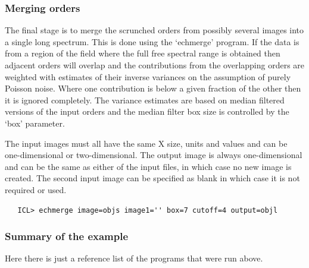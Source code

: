 
\subsubsection{\label{techno13merge}Merging orders}

   The final stage is to merge the scrunched orders from possibly
   several images into a single long spectrum. This is done using the
   `echmerge' program. If the data is from a region of the field where
   the full free spectral range is obtained then adjacent orders will
   overlap and the contributions from the overlapping orders are
   weighted with estimates of their inverse variances on the assumption
   of purely Poisson noise. Where one contribution is below a given
   fraction of the other then it is ignored completely. The variance
   estimates are based on median filtered versions of the input orders
   and the median filter box size is controlled by the `box' parameter.

   The input images must all have the same X size, units and values and
   can be one-dimensional or two-dimensional. The output image is always
   one-dimensional and can be the same as either of the input files, in
   which case no new image is created. The second input image can be
   specified as blank in which case it is not required or used.

\begin{verbatim}
   ICL> echmerge image=objs image1='' box=7 cutoff=4 output=objl
\end{verbatim}


\subsubsection{\label{techno13summary}Summary of the example}

   Here there is just a reference list of the programs that were run
   above.

